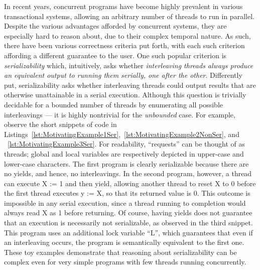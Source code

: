 In recent years, concurrent programs have become highly prevalent in various transactional systems, allowing an arbitrary number of threads to run in parallel.
Despite the various advantages afforded by concurrent systems, they are especially hard to reason about, due to their complex temporal nature.
%
As such, there have been various correctness criteria put forth, with each such criterion affording a different guarantee to the user.
One such popular criterion is \textit{serializability} which, intuitively, asks whether \textit{interleaving threads always produce an equivalent output to running them serially, one after the other}. Differently put, serializability asks whether interleaving threads could output results that are otherwise unattainable in a serial execution.
%
Although this question is trivially decidable for a bounded number of threads by enumerating all possible interleavings --- it is highly nontrivial for the \textit{unbounded} case. For example, observe the short snippets of code in Listings~\ref{lst:MotivatingExample1Ser},~\ref{lst:MotivatingExample2NonSer}, and ~\ref{lst:MotivatingExample3Ser}. For readability, ``requests'' can be thought of as threads; global and local variables are respectively depicted in upper-case and lower-case characters.
%
The first program is clearly serializable because there are no yields, and hence, no interleavings. In the second program, however, a thread can execute X := 1 and then yield, allowing another thread to reset X to 0 before the first thread executes y := X, so that its returned value is 0. This outcome is impossible in any serial execution, since a thread running to completion would always read X as 1 before returning.
Of course, having yields does not guarantee that an execution is necessarily not serializable, as observed in the third snippet. This program uses an additional lock variable ``L'', which guarantees that even if an interleaving occurs, the program is semantically equivalent to the first one.
%
These toy examples demonstrate that reasoning about serializability can be complex even for very simple programs with few threads running concurrently.
%


